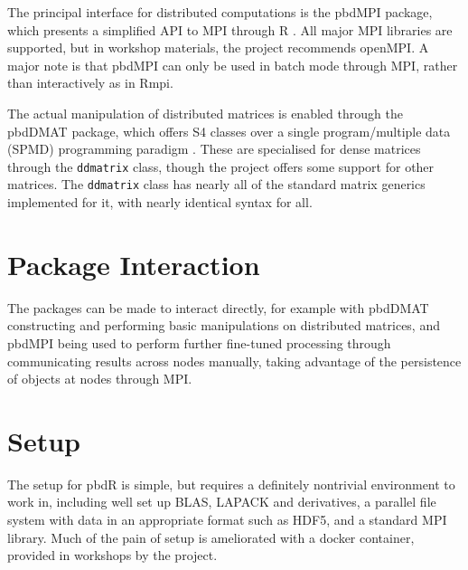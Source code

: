 \documentclass[a4paper,10pt]{article}
\begin{document}
The principal interface for distributed computations is the pbdMPI package,
which presents a simplified API to MPI through R \cite{Chen2012pbdMPIpackage}.
All major MPI libraries are supported, but in workshop materials, the project
recommends openMPI. A major note is that pbdMPI can only be used in batch mode
through MPI, rather than interactively as in Rmpi.

The actual manipulation of distributed matrices is enabled through the pbdDMAT
package, which offers S4 classes over a single program/multiple data (SPMD)
programming paradigm \cite{pbdDMATpackage}. These are specialised for dense
matrices through the \texttt{ddmatrix} class, though the project offers some
support for other matrices. The \texttt{ddmatrix} class has nearly all of the
standard matrix generics implemented for it, with nearly identical syntax for
all.

\section{Package Interaction}
The packages can be made to interact directly, for example with pbdDMAT
constructing and performing basic manipulations on distributed matrices, and
pbdMPI being used to perform further fine-tuned processing through
communicating results across nodes manually, taking advantage of the
persistence of objects at nodes through MPI.

\section{Setup}
The setup for pbdR is simple, but requires a definitely nontrivial environment
to work in, including well set up BLAS, LAPACK and derivatives, a parallel file
system with data in an appropriate format such as HDF5, and a standard MPI
library. Much of the pain of setup is ameliorated with a docker container,
provided in workshops by the project.

\printbibliography{}
\end{document}
